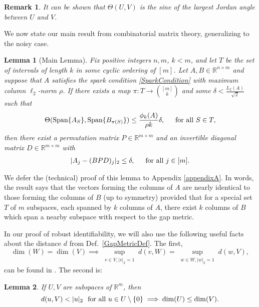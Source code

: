 \documentclass[journal, onecolumn]{IEEEtran}
\newtheorem{lemma}{Lemma}
\newtheorem{remark}{Remark}
\begin{document}
\begin{remark}
It can be shown that $\Theta(U,V)$ is the sine of the largest Jordan angle between $U$ and $V$.
\end{remark}

We now state our main result from combinatorial matrix theory, generalizing \cite[Lemma 1]{Hillar15} to the noisy case.

\begin{lemma}[Main Lemma]\label{MainLemma}
Fix positive integers $n, m$, $k < m$, and let $T$ be the set of intervals of length $k$ in some cyclic ordering of $[m]$. Let $A, B \in \mathbb{R}^{n \times m}$ and suppose that $A$ satisfies the spark condition \eqref{SparkCondition} with maximum column $\ell_2$-norm $\rho$.  If there exists a map $\pi: T \to {[m] \choose k}$ and some $\delta < \frac{L_{2}(A)}{\sqrt{2}}$ such that 
\begin{equation}\label{GapUpperBound}
\Theta(\text{\rm Span}\{A_{S}\}, \text{\rm Span}\{B_{\pi(S)}\}) \leq \frac{ \phi_k(A) }{\rho k} \delta, \indent \text{for all } S \in T,
\end{equation}
%
then there exist a permutation matrix $P \in \mathbb{R}^{m \times m}$ and an invertible diagonal matrix $D \in \mathbb{R}^{m \times m}$ with
\begin{align}
|A_j - (BPD)_j|_2 \leq \delta, \indent \text{for all } j \in [m].
\end{align}
\end{lemma}
We defer the (technical) proof of this lemma to Appendix \ref{appendixA}. In words, the result says that the vectors forming the columns of $A$ are nearly identical to those forming the columns of $B$ (up to symmetry) provided that for a special set $T$ of $m$ subspaces, each spanned by $k$ columns of $A$, there exist $k$ columns of $B$ which span a nearby subspace with respect to the gap metric.

In our proof of robust identifiability, we will also use the following useful facts about the distance $d$ from Def.~\ref{GapMetricDef}. The first, 
\begin{equation}\label{SubspaceMetricSameDim}
\dim(W) = \dim(V) \implies \sup_{\substack{v \in V, |v|_2 = 1}}  d(v,W)  = \sup_{\substack{w \in W, |w|_2 = 1}} d(w,V),
\end{equation}
can be found in \cite[Lemma 3.3]{Morris10}. The second is:
\begin{lemma}\label{MinDimLemma}
If $U, V$ are subspaces of $\mathbb{R}^{m}$, then
\begin{equation}\label{MinDim}
d(u,V) < |u|_2 \ \ \text{\rm for all } u \in U \setminus{\{0\}} \implies \dim(U) \leq \dim(V).
\end{equation}
\end{lemma}
\end{document}
